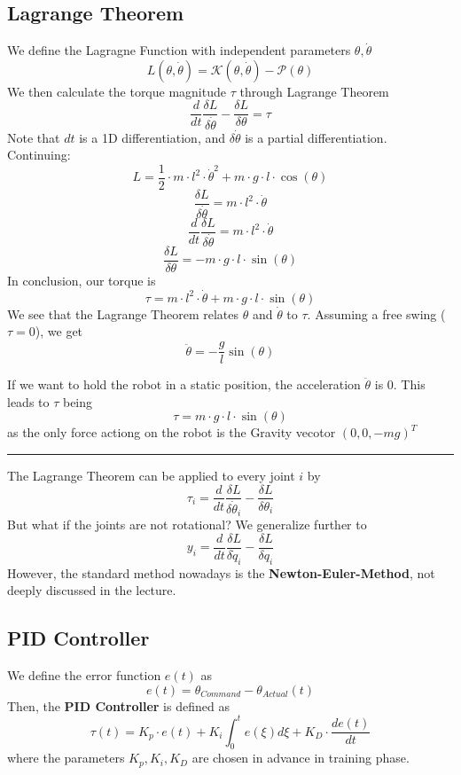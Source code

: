 \documentclass{exerciseBlue}
\begin{document}
\subsection{Lagrange Theorem}
We define the Lagragne Function with independent parameters $\theta,\dot{\theta}$
$$L(\theta,\dot{\theta}) = \mathcal{K}(\theta, \dot{\theta})-\mathcal{P}(\theta)$$
We then calculate the torque magnitude $\tau$ through Lagrange Theorem
$$\dfrac{d}{dt}\dfrac{\delta L}{\delta \dot{\theta}}-\dfrac{\delta L}{\delta \theta} = \tau$$
Note that $dt$ is a 1D differentiation, and $\delta \dot{\theta}$ is a partial differentiation.\\
Continuing:
$$L = \dfrac{1}{2}\cdot m \cdot l^2 \cdot \dot{\theta}^2 + m\cdot g \cdot l\cdot\cos (\theta)$$
$$\dfrac{\delta L}{\delta \dot{\theta}} = m \cdot l^2 \cdot \dot{\theta}$$
$$\dfrac{d}{dt}\dfrac{\delta L}{\delta \dot{\theta}} = m \cdot l^2 \cdot \dot{\theta} $$
$$\dfrac{\delta L}{\delta {\theta}} = -m\cdot g \cdot l\cdot\sin (\theta)$$
In conclusion, our torque is 
$$\tau = m \cdot l^2 \cdot \dot{\theta} + m\cdot g \cdot l\cdot\sin (\theta)$$
We see that the Lagrange Theorem relates $\theta$ and $\dot{\theta}$ to $\tau$. Assuming a free swing ($\tau = 0$), we get 
$$\ddot{\theta} = - \dfrac{g}{l}\sin(\theta)$$
\par If we want to hold the robot in a static position, the acceleration $\ddot{\theta}$ is 0. This leads to $\tau$ being
$$\tau = m \cdot g \cdot l \cdot \sin(\theta)$$ as the only force actiong on the robot is the Gravity vecotor $(0,0,-mg)^T$\\
\noindent\rule{\textwidth}{0.3pt}
\par The Lagrange Theorem can be applied to every joint $i$ by 
$$\tau_i = \dfrac{d}{dt}\dfrac{\delta L}{\delta \dot{\theta}_i}-\dfrac{\delta L}{\delta \theta_i}$$
But what if the joints are not rotational? We generalize further to
$$y_i = \dfrac{d}{dt}\dfrac{\delta L}{\delta \dot{q}_i}-\dfrac{\delta L}{\delta q_i}$$
However, the standard method nowadays is the \textbf{Newton-Euler-Method}, not deeply discussed in the lecture.
\subsection{PID Controller}
We define the error function $e(t)$ as
$$e(t) = \theta_{Command} - \theta_{Actual}(t)$$
Then, the \textbf{PID Controller} is defined as
$$\tau (t) = K_p\cdot e(t)+K_i\int_{0}^{t}e(\xi)d\xi + K_D\cdot \dfrac{de(t)}{dt}$$
where the parameters $K_p, K_i, K_D$ are chosen in advance in training phase.
\end{document}
